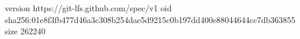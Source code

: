 version https://git-lfs.github.com/spec/v1
oid sha256:01e8f3fb477d46a3c308b254dae5d9215c0b197dd400e88044644cc7db363855
size 262240
